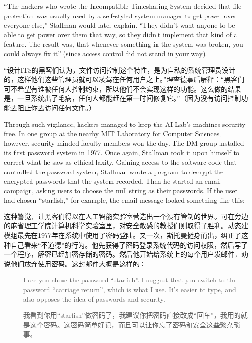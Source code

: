 \ifdefined\eng
``The hackers who wrote the Incompatible Timesharing System decided that file protection was usually used by a self-styled system manager to get power over everyone else,'' Stallman would later explain. ``They didn't want anyone to be able to get power over them that way, so they didn't implement that kind of a feature. The result was, that whenever something in the system was broken, you could always fix it'' (since access control did not stand in your way).
\fi

\ifdefined\chs
``设计ITS的黑客们认为，文件访问控制这个特性，是为自私的系统管理员设计的，这样他们这些管理员就可以凌驾在任何用户之上。''理查德事后解释：``黑客们可不希望有谁被任何人控制约束，所以他们不会实现这样的功能。这么做的结果是，一旦系统出了毛病，任何人都能赶在第一时间修复它。''（因为没有访问控制功能去阻止你去访问任何文件。）
\fi

\ifdefined\eng
Through such vigilance, hackers managed to keep the AI Lab's machines security-free. In one group at the nearby MIT Laboratory for Computer Sciences, however, security-minded faculty members won the day. The DM group installed its first password system in 1977. Once again, Stallman took it upon himself to correct what he saw as ethical laxity. Gaining access to the software code that controlled the password system, Stallman wrote a program to decrypt the encrypted passwords that the system recorded.  Then he started an email campaign, asking users to choose the null string as their passwords. If the user had chosen ``starfish,'' for example, the email message looked something like this:
\fi

\ifdefined\chs
这种警觉，让黑客们得以在人工智能实验室营造出一个没有管制的世界。可在旁边的麻省理工学院计算机科学实验室里，对安全敏感的教授们则取得了胜利。动态建模组最先在1977年在系统中使用了密码登陆。又一次，斯托曼挺身而出，纠正了这种自己看来``不道德''的行为。他先获得了密码登录系统代码的访问权限，然后写了一个程序，解密已经加密存储的密码。然后他开始给系统上的每个用户发邮件，劝说他们放弃使用密码。这封邮件大概是这样的：
\fi

\ifdefined\eng
\begin{quote}
I see you chose the password ``starfish''. I suggest that you switch to the password ``carriage return'', which is what I use. It's easier to type, and also opposes the idea of passwords and security.
\end{quote}
\fi

\ifdefined\chs
\begin{quote}
我看到你用``starfish''做密码了，我建议你把密码直接改成``回车''，我用的就是这个密码。这密码简单好记，而且可以让你忘了密码和安全这些繁杂琐事。
\end{quote}
\fi

